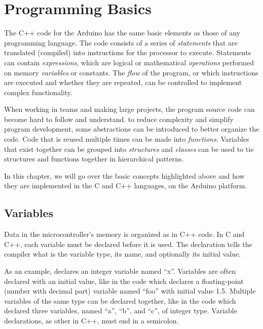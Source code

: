 
\chapter{Programming Basics}

The C++ code for the Arduino has the same basic elements as those of any programming language. 
The code consists of a series of \emph{statements} that are translated (compiled) into instructions for the processor to execute.
Statements can contain \emph{expressions}, which are logical or mathematical \emph{operations} performed on memory \emph{variables} or constants.
The \emph{flow} of the program, or which instructions are executed and whether they are repeated, can be controlled to implement complex functionality.

When working in teams and making large projects, the program source code can become hard to follow and understand.
to reduce complexity and simplify program development, some abstractions can be introduced to better organize the code.
Code that is reused multiple times can be made into \emph{functions}.
Variables that exist together can be grouped into \emph{structures} and \emph{classes} can be used to tie structures and functions together in hierarchical patterns.

In this chapter, we will go over the basic concepts highlighted above and how they are implemented in the C and C++ languages, on the Arduino platform.

\section{Variables}
\label{sec:variables}
Data in the microcontroller's memory is organized as  in C++ code.
In C and C++, each variable must be declared before it is used.
The declaration tells the compiler what is the variable type, its name, and optionally its initial value.

As an example,  declares an integer variable named ``x''.
Variables are often declared with an initial value, like in the code  which declares a floating-point (number with decimal part) variable named ``foo'' with initial value \num{1.5}.
Multiple variables of the same type can be declared together, like in the code  which declared three variables, named ``a'', ``b'', and ``c'', of integer type.
Variable declarations, as other  in C++, must end in a semicolon.


